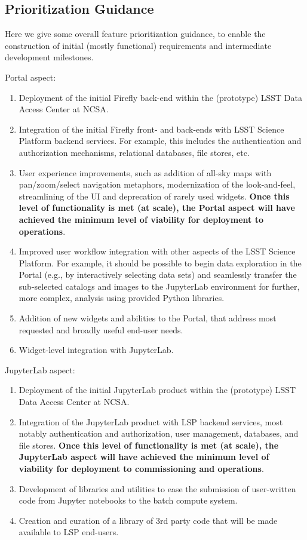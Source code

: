 \subsection{Prioritization Guidance}

Here we give some overall feature prioritization guidance, to enable the construction of initial (mostly functional) requirements and intermediate development milestones.

Portal aspect:
\begin{enumerate}
	\item Deployment of the initial Firefly back-end within the (prototype) LSST Data Access Center at NCSA.
	\item Integration of the initial Firefly front- and back-ends with LSST Science Platform backend services. For example, this includes the authentication and authorization mechanisms, relational databases, file stores, etc.
	\item User experience improvements, such as addition of all-sky maps with pan/zoom/select navigation metaphors, modernization of the look-and-feel, streamlining of the UI and deprecation of rarely used widgets. \textbf{Once this level of functionality is met (at scale), the Portal aspect will have achieved the minimum level of viability for deployment to operations}.
	\item Improved user workflow integration with other aspects of the LSST Science Platform. For example, it should be possible to begin data exploration in the Portal (e.g., by interactively selecting data sets) and seamlessly transfer the sub-selected catalogs and images to the JupyterLab environment for further, more complex, analysis using provided Python libraries.
	\item Addition of new widgets and abilities to the Portal, that address most requested and broadly useful end-user needs.
	\item Widget-level integration with JupyterLab.
\end{enumerate}

JupyterLab aspect:
\begin{enumerate}
	\item Deployment of the initial JupyterLab product within the (prototype) LSST Data Access Center at NCSA.
	\item Integration of the JupyterLab product with LSP backend services, most notably authentication and authorization, user management, databases, and file stores. \textbf{Once this level of functionality is met (at scale), the JupyterLab aspect will have achieved the minimum level of viability for deployment to commissioning and operations}.
	\item Development of libraries and utilities to ease the submission of user-written code from Jupyter notebooks to the batch compute system.
	\item Creation and curation of a library of 3rd party code that will be made available to LSP end-users.
\end{enumerate}

